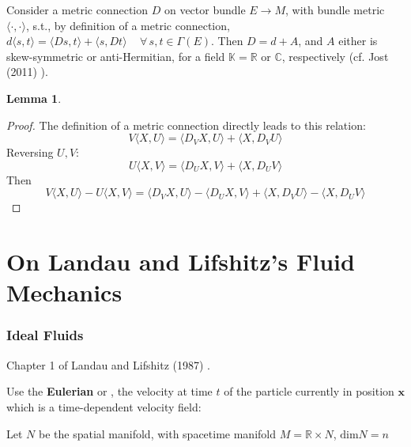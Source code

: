 \documentclass[twoside,landscape,10pt]{amsart}
\theoremstyle{plain}
\newtheorem{lemma}{Lemma}
\theoremstyle{definition}
\theoremstyle{remark}
\theoremstyle{remark}
\begin{document}
\begin{multicols*}{2}
Consider a metric connection $D$ on vector bundle $E\to M$, with bundle metric $\langle \cdot , \cdot \rangle$, s.t., by definition of a metric connection, $d\langle s,t\rangle = \langle Ds,t \rangle + \langle s,Dt\rangle \quad \, \forall \, s,t \in \Gamma(E)$.  Then $D=d+A$, and $A$ either is skew-symmetric or anti-Hermitian, for a field $\mathbb{K} = \mathbb{R}$ or $\mathbb{C}$, respectively (cf. Jost (2011) \cite{JJost2011}).  

  

\begin{lemma}
\end{lemma}

\begin{proof}
The definition of a metric connection directly leads to this relation:
\[
V\langle X,U \rangle = \langle D_VX,U\rangle + \langle X,D_VU \rangle
\]
Reversing $U,V$:
\[
U\langle X,V \rangle = \langle D_UX,V\rangle + \langle X,D_UV \rangle
\]
Then 
\[
V\langle X,U \rangle - U\langle X,V \rangle = \langle D_VX,U\rangle - \langle D_UX,V\rangle  + \langle X,D_VU \rangle - \langle X,D_UV \rangle
\]


\end{proof}


\part{On Landau and Lifshitz's \textbf{Fluid Mechanics}}\cite{LLandauELifshitz1987}

\section{Ideal Fluids} Chapter 1 of Landau and Lifshitz (1987) \cite{LLandauELifshitz1987}.  

Use the \textbf{Eulerian} or , the velocity at time $t$ of the particle currently in position $\mathbf{x}$ \cite{DHolmTSchmahCStoica2009} which is a time-dependent velocity field:

Let $N$ be the spatial manifold, with spacetime manifold $M = \mathbb{R} \times N$, $\text{dim}N=n$  



\end{multicols*}
\end{document}
